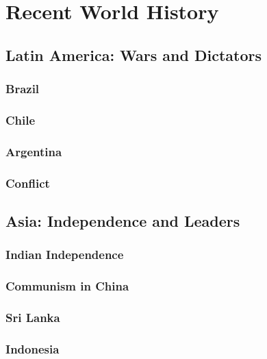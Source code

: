\chapter{Recent World History}

\section{Latin America: Wars and Dictators}

\subsection*{Brazil}

\subsection*{Chile}

\subsection*{Argentina}

\subsection*{Conflict}

\section{Asia: Independence and Leaders}

\subsection*{Indian Independence}

\subsection*{Communism in China}

\subsection*{Sri Lanka}

\subsection*{Indonesia}

